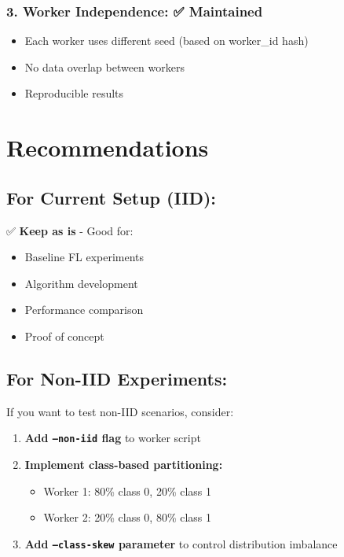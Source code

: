 \documentclass[12pt]{article}
\begin{document}
\subsubsection{3. Worker Independence: ✅ Maintained}
\begin{itemize}
    \item Each worker uses different seed (based on worker\_id hash)
    \item No data overlap between workers
    \item Reproducible results
\end{itemize}

\section{Recommendations}

\subsection{For Current Setup (IID):}

✅ \textbf{Keep as is} - Good for:
\begin{itemize}
    \item Baseline FL experiments
    \item Algorithm development
    \item Performance comparison
    \item Proof of concept
\end{itemize}

\subsection{For Non-IID Experiments:}

If you want to test non-IID scenarios, consider:

\begin{enumerate}
    \item \textbf{Add \texttt{--non-iid} flag} to worker script
    \item \textbf{Implement class-based partitioning:}
    \begin{itemize}
        \item Worker 1: 80\% class 0, 20\% class 1
        \item Worker 2: 20\% class 0, 80\% class 1
    \end{itemize}
    \item \textbf{Add \texttt{--class-skew} parameter} to control distribution imbalance
\end{enumerate}
\end{document}
